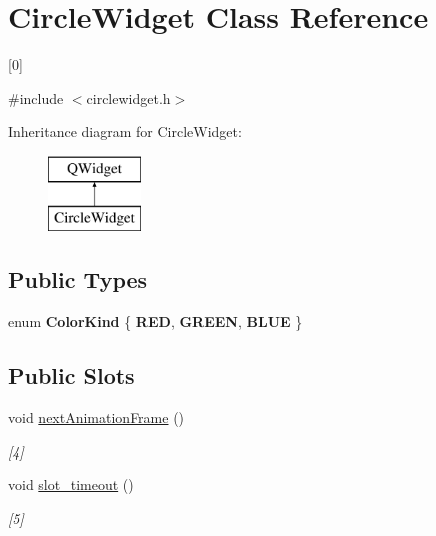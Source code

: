 \hypertarget{class_circle_widget}{\section{Circle\-Widget Class Reference}
\label{class_circle_widget}
}


\mbox{[}0\mbox{]}  




{\ttfamily \#include $<$circlewidget.\-h$>$}

Inheritance diagram for Circle\-Widget\-:\begin{figure}[H]
\begin{center}
\leavevmode
\includegraphics[height=2.000000cm]{class_circle_widget}
\end{center}
\end{figure}
\subsection*{Public Types}
\begin{DoxyCompactItemize}
\item 
enum {\bfseries Color\-Kind} \{ {\bfseries R\-E\-D}, 
{\bfseries G\-R\-E\-E\-N}, 
{\bfseries B\-L\-U\-E}
 \}
\end{DoxyCompactItemize}
\subsection*{Public Slots}
\begin{DoxyCompactItemize}
\item 
void \hyperlink{class_circle_widget_ae98951095744e9f6ceb446093270fe03}{next\-Animation\-Frame} ()
\begin{DoxyCompactList}\small\item\em \mbox{[}4\mbox{]} \end{DoxyCompactList}\item 
\hypertarget{class_circle_widget_a070cd25f6215b86de995b3b9a4970a06}{void \hyperlink{class_circle_widget_a070cd25f6215b86de995b3b9a4970a06}{slot\-\_\-timeout} ()}\label{class_circle_widget_a070cd25f6215b86de995b3b9a4970a06}

\begin{DoxyCompactList}\small\item\em \mbox{[}5\mbox{]} \end{DoxyCompactList}\end{DoxyCompactItemize}
